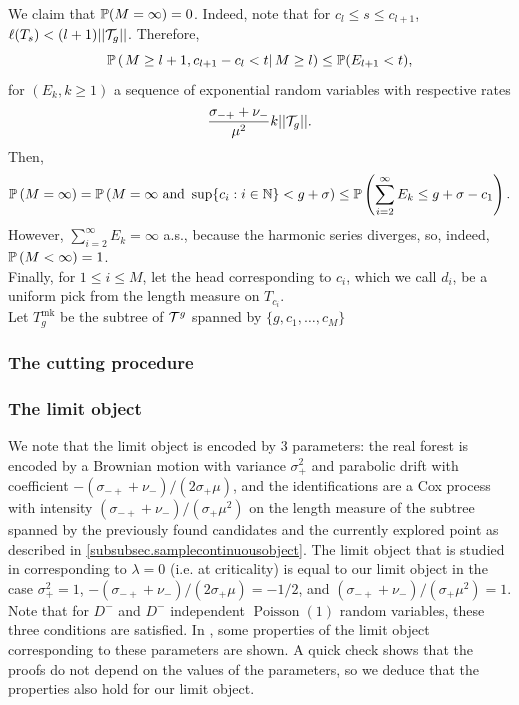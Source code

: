 We claim that $\P(M=\infty)=0$. Indeed, note that for $c_l\leq s\leq c_{l+1}$, $\ell(T_s)<(l+1)||\cT_g||$. Therefore, 
$$\P\left(\left.M\geq l+1,c_{l+1}-c_l<t \right|M\geq l\right)\leq \P(E_{l+1}<t),$$
for $(E_{k},k\geq 1)$ a sequence of exponential random variables with respective rates $$\frac{\sigma_{-+}+\nu_-}{\mu^2}k||\cT_g||.$$ 
Then,
$$\P\left(M=\infty \right)=\P\left(M=\infty\text{ and }\sup\{c_i:i\in \N\}<g+\sigma\right)\leq \P\left(\sum_{i=2}^\infty E_k\leq g+\sigma-c_1\right).$$
However, $\sum_{i=2}^\infty E_k=\infty$ a.s., because the harmonic series diverges, so, indeed, $\P\left(M<\infty \right)=1$. \\
Finally, for $1\leq i \leq M$, let the head corresponding to $c_i$, which we call $d_i$, be a uniform pick from the length measure on $T_{c_i}$. \\
Let $T^{\text{mk}}_g$ be the subtree of $\cT^{g}$ spanned by $\{g,c_1,\dots,c_M\}$ 
\subsubsection{The cutting procedure}

\subsubsection{The limit object}
We note that the limit object is encoded by $3$ parameters: the real forest is encoded by a Brownian motion with variance $\sigma_+^2$ and parabolic drift with coefficient $-(\sigma_{-+}+\nu_-)/(2\sigma_+\mu)$, and the identifications are a Cox process with intensity $(\sigma_{-+}+\nu_-)/(\sigma_+\mu^2)$ on the length measure of the subtree spanned by the previously found candidates and the currently explored point as described in \ref{subsubsec.samplecontinuousobject}. The limit object that is studied in \cite{Goldschmidt2019} corresponding to $\lambda=0$ (i.e. at criticality) is equal to our limit object in the case $\sigma_+^2=1$, $-(\sigma_{-+}+\nu_-)/(2\sigma_+\mu)=-1/2$, and $(\sigma_{-+}+\nu_-)/(\sigma_+\mu^2)=1$. Note that for $D^-$ and $D^-$ independent $\operatorname{Poisson}(1)$ random variables, these three conditions are satisfied. In \cite{Goldschmidt2019}, some properties of the limit object corresponding to these parameters are shown. A quick check shows that the proofs do not depend on the values of the parameters, so we deduce that the properties also hold for our limit object.





